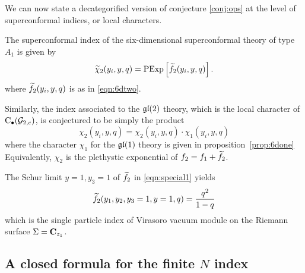We can now state a decategorified version of conjecture \ref{conj:ops} at the level of superconformal indices, or local characters.

\begin{conj}\label{conj:6dtwo}
The superconformal index of the six-dimensional superconformal theory of type $A_1$ is given by
\[
\widetilde \chi_{2} (y_i,y,q) = {\rm PExp} \left[\widetilde f_2(y_i,y,q) \right] .
\]
where $\widetilde f_2(y_i,y,q)$ is as in \eqref{eqn:6dtwo}.
\end{conj}

Similarly, the index associated to the $\mathfrak{gl}(2)$ theory, which is the local character of ${\rm C}_\bullet(\mathcal G_{2,c})$, is conjectured to be simply the product 
\[
\chi_{2} (y_i,y,q) = \chi_{2} (y_i,y,q) \cdot \chi_{1}(y_i,y,q)
\]
where the character $\chi_{1}$ for the $\mathfrak{gl}(1)$ theory is given in proposition~\ref{prop:6done}
Equivalently, $\chi_2$ is the plethystic exponential of $f_2 = f_1 + \widetilde f_2$. 

%

\parsec[]

The Schur limit $y=1, y_3=1$ of $\widetilde f_2$ in \eqref{eqn:special1} yields 
\[
\widetilde f_{2}(y_1, y_2, y_3=1, y=1, q) = \frac{q^2}{1-q} 
\]
which is the single particle index of Virasoro vacuum module on the Riemann surface $\Sigma = \mathbf{C}_{z_1}$. 

\subsection{A closed formula for the finite $N$ index}

